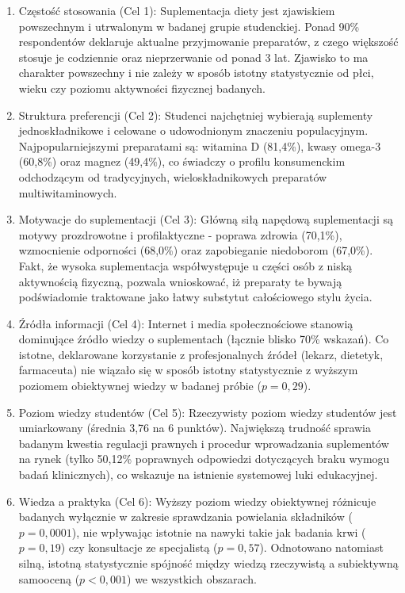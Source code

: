 \begin{enumerate}
    \item Częstość stosowania (Cel 1): Suplementacja diety jest zjawiskiem powszechnym i utrwalonym w badanej grupie studenckiej. Ponad 90\% respondentów deklaruje aktualne przyjmowanie preparatów, z czego większość stosuje je codziennie oraz nieprzerwanie od ponad 3 lat. Zjawisko to ma charakter powszechny i nie zależy w sposób istotny statystycznie od płci, wieku czy poziomu aktywności fizycznej badanych.
    \item Struktura preferencji (Cel 2): Studenci najchętniej wybierają suplementy jednoskładnikowe i celowane o udowodnionym znaczeniu populacyjnym. Najpopularniejszymi preparatami są: witamina D (81,4\%), kwasy omega-3 (60,8\%) oraz magnez (49,4\%), co świadczy o profilu konsumenckim odchodzącym od tradycyjnych, wieloskładnikowych preparatów multiwitaminowych.
    \item Motywacje do suplementacji (Cel 3): Główną siłą napędową suplementacji są motywy prozdrowotne i profilaktyczne - poprawa zdrowia (70,1\%), wzmocnienie odporności (68,0\%) oraz zapobieganie niedoborom (67,0\%). Fakt, że wysoka suplementacja współwystępuje u części osób z niską aktywnością fizyczną, pozwala wnioskować, iż preparaty te bywają podświadomie traktowane jako łatwy substytut całościowego stylu życia.
    \item Źródła informacji (Cel 4): Internet i media społecznościowe stanowią dominujące źródło wiedzy o suplementach (łącznie blisko 70\% wskazań). Co istotne, deklarowane korzystanie z profesjonalnych źródeł (lekarz, dietetyk, farmaceuta) nie wiązało się w sposób istotny statystycznie z wyższym poziomem obiektywnej wiedzy w badanej próbie ($p = 0,29$).
    \item Poziom wiedzy studentów (Cel 5): Rzeczywisty poziom wiedzy studentów jest umiarkowany (średnia 3,76 na 6 punktów). Największą trudność sprawia badanym kwestia regulacji prawnych i procedur wprowadzania suplementów na rynek (tylko 50,12\% poprawnych odpowiedzi dotyczących braku wymogu badań klinicznych), co wskazuje na istnienie systemowej luki edukacyjnej.
    \item Wiedza a praktyka (Cel 6): Wyższy poziom wiedzy obiektywnej różnicuje badanych wyłącznie w zakresie sprawdzania powielania składników ($p = 0,0001$), nie wpływając istotnie na nawyki takie jak badania krwi ($p = 0,19$) czy konsultacje ze specjalistą ($p = 0,57$). Odnotowano natomiast silną, istotną statystycznie spójność między wiedzą rzeczywistą a subiektywną samooceną ($p < 0,001$) we wszystkich obszarach.
\end{enumerate}

